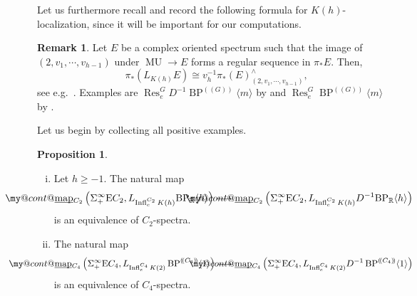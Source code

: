 \documentclass[a4paper, 10pt]{article}
\makeatletter
\newcommand{\MU}{\operatorname{MU}}
\newcommand{\BPGm}{{\BP^{(\!(G)\!)}}\langle m\rangle}
\newcommand{\BP}{\operatorname{BP}}
\newcommand{\BPR}{{\BP_{\mathbb{R}}}}
\newcommand{\Res}{\operatorname{Res}}
\newcommand{\map}{\operatorname{map}}
\newcommand{\Infl}{\operatorname{Infl}}
\DeclareRobustCommand{\myuline}[2][0pt]{%
  \ifmmode
    \uline{\hphantom{#2}\kern-#1}%
    \kern#1%
    \mathllap{\mathpalette\my@cont@{#2}}%
  \else
    \uline{\phantom{#2}\kern-#1}%
    \kern#1%
    \llap{\contour{white}{#2}}%
  \fi
}
\newcommand{\ul}{\myuline}
\newcommand{\my@cont@}[2]{\contour{white}{\mbox{$\m@th#1#2$}}}
\theoremstyle{definition}
\newtheorem{remark}[remark]{Remark}
\newtheorem{proposition}[proposition]{Proposition}
\makeatother
\begin{document}
Let us furthermore recall and record the following formula for $K(h)$-localization, since it will be important for our computations.

\begin{remark} \label{remark: Kh localization}
    Let $E$ be a complex oriented spectrum such that the image of $(2,v_1, \cdots, v_{h-1})$ under $\MU \to E$ forms a regular sequence in $\pi_*E$. Then,
    \[ \pi_*(L_{K(h)}E) \cong v_h^{-1}\pi_*(E)_{(2,v_1,\cdots,v_{h-1})}^{\wedge}, \]
    see e.g.~\cite[Proposition 7.4]{beaudryHillShiZeng2021modelsLubinTate}. Examples are $\Res_e^G D^{-1} \BPGm$ by \cite[Proposition 7.4]{beaudryHillShiZeng2021modelsLubinTate} and $\Res_e^G \BPGm$ by \cite[Corollary 3.3]{carrick2025higherrealktheoriesfinite}.
\end{remark}

Let us begin by collecting all positive examples. 

\begin{proposition}
    \hfill \label{prop: positive examples lubin tate}
    \begin{enumerate}[(i)]
        \item Let $h \geq -1$. The natural map 
        \[ \ul{\map}_{C_2}\left(\Sigma_+^{\infty} \mathrm{E}C_2, L_{\Infl_e^{C_2}K(h)} \BPR\langle h \rangle \right) \longrightarrow \ul{\map}_{C_2}\left(\Sigma_+^{\infty} \mathrm{E}C_2, L_{\Infl_e^{C_2}K(h)} D^{-1} \BPR\langle h \rangle \right) \]
        is an equivalence of $C_2$-spectra.
        \item The natural map 
        \[ \ul{\map}_{C_4}\left(\Sigma_+^{\infty} \mathrm{E}C_4, L_{\Infl_e^{C_4} K(2)} \BP^{( \! ( C_4 ) \! )} \langle 1 \rangle \right) \longrightarrow \ul{\map}_{C_4}\left(\Sigma_+^{\infty} \mathrm{E}C_4, L_{\Infl_e^{C_4} K(2)} D^{-1}\BP^{( \! ( C_4 ) \! )} \langle 1 \rangle \right) \] 
        is an equivalence of $C_4$-spectra.
    \end{enumerate}
\end{proposition}
\end{document}
